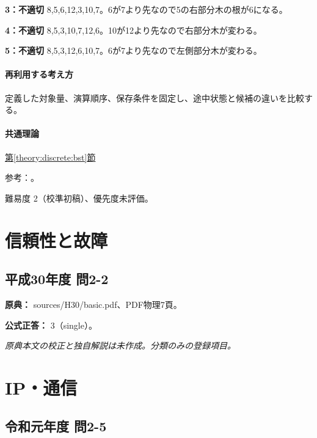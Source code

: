 \noindent\textbf{3：不適切} 8,5,6,12,3,10,7。6が7より先なので5の右部分木の根が6になる。\par

\noindent\textbf{4：不適切} 8,5,3,10,7,12,6。10が12より先なので右部分木が変わる。\par

\noindent\textbf{5：不適切} 8,5,3,12,6,10,7。6が7より先なので左側部分木が変わる。\par

\paragraph{再利用する考え方} 定義した対象量、演算順序、保存条件を固定し、途中状態と候補の違いを比較する。

\paragraph{共通理論} \hyperref[theory:discrete:bst]{第\ref*{theory:discrete:bst}節}

\par 参考：\cite{princeton_bst}。

\par 難易度 2（校準初稿）、優先度未評価。

\section{信頼性と故障}

\subsection{平成30年度 問2-2}
\label{q:h30-reg-basic-2-2}

\noindent\textbf{原典：} sources/H30/basic.pdf、PDF物理7頁。

\textbf{公式正答：} 3（single）。

\par\textit{原典本文の校正と独自解説は未作成。分類のみの登録項目。}

\section{IP・通信}

\subsection{令和元年度 問2-5}
\label{q:r01-reg-basic-2-5}


